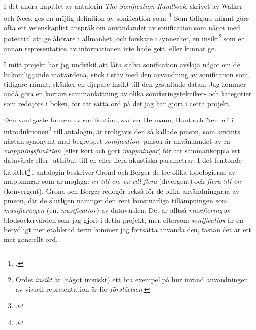 \documentclass[11pt, a4paper]{article} %
\begin{document}
I det andra kapitlet av antalogin \emph{The Sonification Handbook}, skrivet av Walker och Nees, ges en möjlig definition av \gls{sonification} som: 
\footcite[9]{hermann_theory_2011}
Som tidigare nämnt görs ofta ett vetenskapligt anspråk om användandet av \gls{sonification} som något med potential att ge åhörare i allmänhet, och forskare i synnerhet, en insikt\footnote{Ordet \emph{insikt} är (något ironiskt) ett bra exempel på hur invand användningen av visuell representation är för \emph{förståelsen}.} som en annan representation av informationen inte hade gett, eller kunnat ge.  

I mitt projekt har jag undvikit att låta själva \gls{sonification} avslöja något om de bakomliggande mätvärdena, stick i stäv med den användning av \gls{sonification} som, tidigare nämnt, skänker en djupare insikt till den gestaltade datan. Jag kommer ändå göra en kortare sammanfattning av olika sonifieringstekniker-  och kategorier som redogörs i boken, för att sätta ord på det jag har gjort i detta projekt.

Den vanligaste formen av \gls{sonification}, skriver Hermann, Hunt och Neuhoff i introduktionen\footcite[5]{hermann_introduction_2011} till antalogin, är troligtvis den så kallade \gls{pmson}, som använts nästan synonymt med begreppet \emph{\gls{sonification}}. \gls{pmson} är användandet av en \emph{mappningsfunktion} (eller kort och gott \emph{mappningar}) för att sammankoppla ett datavärde eller -attribut till en eller flera akustiska parametrar. I det femtonde kapitlet\footcite{hermann_parameter_2011} i antalogin beskriver Grond och Berger de tre olika topologierna av mappningar som är möjliga: \emph{en-till-en}, \emph{en-till-flera} (divergent) och \emph{flera-till-en} (konvergent). Grond och Berger redogör också för de olika användningarna av \gls{pmson}, där de slutligen namnger den rent konstnärliga tillämpningen som \emph{musifieringen} (en. \emph{musification}) av datavärden. Det är alltså \emph{musifiering} av blodsockervärden som jag gjort i detta projekt, men eftersom \emph{\gls{sonification}} är en betydligt mer etablerad term kommer jag fortsätta använda den, fastän det är ett mer generellt ord.
\end{document}
